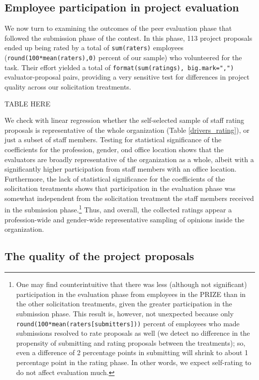 \documentclass[12pt, titlepage]{article}
\begin{document}
\subsection{Employee participation in project
evaluation}\label{employee-participation-in-project-evaluation}

We now turn to examining the outcomes of the peer evaluation phase that
followed the submission phase of the contest. In this phase, 113 project
proposals ended up being rated by a total of \texttt{sum(raters)}
employees (\texttt{round(100*mean(raters),0)} percent of our sample) who
volunteered for the task. Their effort yielded a total of
\texttt{format(sum(ratings),\ big.mark=",")} evaluator-proposal pairs,
providing a very sensitive test for differences in project quality
across our solicitation treatments.

TABLE HERE

We check with linear regression whether the self-selected sample of
staff rating proposals is representative of the whole organization
(Table \ref{drivers_rating}), or just a subset of staff members. Testing
for statistical significance of the coefficients for the profession,
gender, ond office location shows that the evaluators are broadly
representative of the organization as a whole, albeit with a
significantly higher participation from staff members with an office
location. Furthermore, the lack of statistical significance for the
coefficients of the solicitation treatments shows that participation in
the evaluation phase was somewhat independent from the solicitation
treatment the staff members received in the submission phase.\footnote{One
  may find counterintuitive that there was less (although not
  significant) participation in the evaluation phase from employees in
  the PRIZE than in the other solicitation treatments, given the greater
  participation in the submission phase. This result is, however, not
  unexpected because only
  \texttt{round(100*mean(raters{[}submitters{]}))} percent of employees
  who made submissions resolved to rate proposals as well (we detect no
  difference in the propensity of submitting and rating proposals
  between the treatments); so, even a difference of 2 percentage points
  in submitting will shrink to about 1 percentage point in the rating
  phase. In other words, we expect self-rating to do not affect
  evaluation much.} Thus, and overall, the collected ratings appear a
profession-wide and gender-wide representative sampling of opinions
inside the organization.

\subsection{The quality of the project
proposals}\label{the-quality-of-the-project-proposals}
\end{document}
